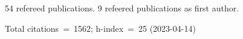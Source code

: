 54 refereed publications. 9 refeered publications as first author.

Total citations~=~1562; h-index~=~25 (2023-04-14)